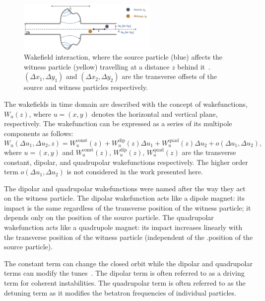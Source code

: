 \begin{figure}[!h] %
    \centering         
    \includegraphics[width=0.6\textwidth]{images/Ch2/wakefield_example.png}
        \caption{Wakefield interaction, where the source particle (blue) affects the witness particle (yellow) travelling at a distance $z$ behind it~\cite{instabilities_rumulo_li}. $(\Delta x_1, \Delta y_1)$ and $ (\Delta x_2, \Delta y_2)$ are the transverse offsets of the source and witness particles respectively.} 
        \label{fig:wakefields}
 \end{figure}

The wakefields in time domain are described with the concept of wakefunctions, $W_u(z)$, where $u=(x,y)$ denotes the horizontal and vertical plane, respectively. The wakefunction can be expressed as a series of its multipole components as follows: %
\begin{equation}\label{eq:wakefunctions}
    W_u(\Delta u_1, \Delta u_2, z) = W^\mathrm{const}_u(z) + W^\mathrm{dip}_u(z)\Delta u_1 +  W^\mathrm{quad}_u(z)\Delta u_2 + o(\Delta u_1, \Delta u_2),
\end{equation}
where $u=(x,y)$ and $W^\mathrm{const}_u(z)$, $W^\mathrm{dip}_u(z)$, $W^\mathrm{quad}_u(z)$ are the transverse constant, dipolar, and quadrupolar wakefunctions respectively. The higher order term $ o(\Delta u_1, \Delta u_2)$ is not considered in the work presented here. %

The dipolar and quadrupolar wakefunctions were named after the way they act on the witness particle. The dipolar wakefunction acts like a dipole magnet: its impact is the same regardless of the transverse position of the witness particle; it depends only on the position of the source particle. The quadrupolar wakefunction acts like a quadrupole magnet: its impact increases linearly with the transverse position of the witness particle (independent of the .position of the source particle). %

The constant term can change the closed orbit while the dipolar and quadrupolar terms can modify the tunes~\cite{benoit_ipac19_impedance}. The dipolar term is often referred to as a driving term for coherent instabilities. The quadrupolar term is often referred to as the detuning term as it modifies the betatron frequencies of individual particles. %

